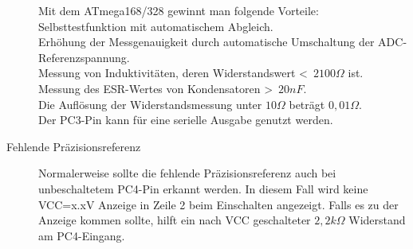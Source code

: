 \begin{description}
Mit dem ATmega168/328 gewinnt man folgende Vorteile:
Selbsttestfunktion mit automatischem Abgleich.\\
Erhöhung der Messgenauigkeit durch automatische Umschaltung der ADC-Referenzspannung.\\
Messung von Induktivitäten, deren Widerstandswert \textless~\(2100\Omega\) ist.\\
Messung des ESR-Wertes von Kondensatoren \textgreater~\(20nF\).\\
Die Auflösung der Widerstandsmessung unter \(10\Omega\) beträgt \(0,01\Omega\).\\
Der PC3-Pin kann für eine serielle Ausgabe genutzt werden.
\item[Fehlende Präzisionsreferenz]
Normalerweise sollte die fehlende Präzisionsreferenz auch bei unbeschaltetem PC4-Pin
erkannt werden. In diesem Fall wird keine VCC=x.xV Anzeige in Zeile 2 beim Einschalten
angezeigt. Falls es zu der Anzeige kommen sollte, hilft ein nach VCC geschalteter 
\(2,2k\Omega\) Widerstand am PC4-Eingang.
\end{description}

